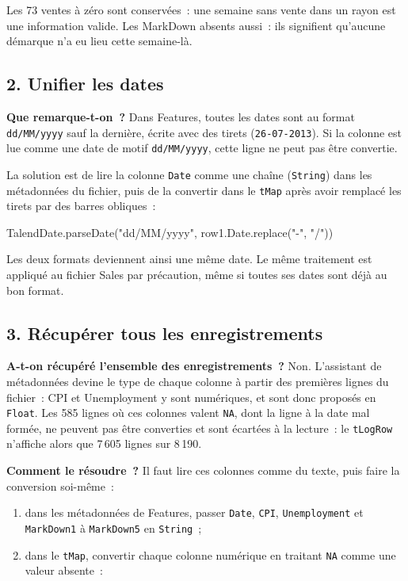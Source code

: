 \noindent Les 73 ventes à zéro sont conservées~: une semaine sans vente dans un rayon est une information valide. Les MarkDown absents aussi~: ils signifient qu'aucune démarque n'a eu lieu cette semaine-là.

\subsection*{2. Unifier les dates}
{}

\noindent \textbf{Que remarque-t-on~?} Dans Features, toutes les dates sont au format \texttt{dd/MM/yyyy} sauf la dernière, écrite avec des tirets (\texttt{26-07-2013}). Si la colonne est lue comme une date de motif \texttt{dd/MM/yyyy}, cette ligne ne peut pas être convertie.

\noindent La solution est de lire la colonne \texttt{Date} comme une chaîne (\texttt{String}) dans les métadonnées du fichier, puis de la convertir dans le \texttt{tMap} après avoir remplacé les tirets par des barres obliques~:

\begin{code}[title=\textbf{Expression de la colonne Date} (sortie de type Date)]
TalendDate.parseDate("dd/MM/yyyy", row1.Date.replace("-", "/"))
\end{code}

\noindent Les deux formats deviennent ainsi une même date. Le même traitement est appliqué au fichier Sales par précaution, même si toutes ses dates sont déjà au bon format.

\subsection*{3. Récupérer tous les enregistrements}
{}

\noindent \textbf{A-t-on récupéré l'ensemble des enregistrements~?} Non. L'assistant de métadonnées devine le type de chaque colonne à partir des premières lignes du fichier~: CPI et Unemployment y sont numériques, et sont donc proposés en \texttt{Float}. Les 585 lignes où ces colonnes valent \texttt{NA}, dont la ligne à la date mal formée, ne peuvent pas être converties et sont écartées à la lecture~: le \texttt{tLogRow} n'affiche alors que 7\,605 lignes sur 8\,190.

\noindent \textbf{Comment le résoudre~?} Il faut lire ces colonnes comme du texte, puis faire la conversion soi-même~:
\begin{enumerate}
	\item dans les métadonnées de Features, passer \texttt{Date}, \texttt{CPI}, \texttt{Unemployment} et \texttt{MarkDown1} à \texttt{MarkDown5} en \texttt{String}~;
	\item dans le \texttt{tMap}, convertir chaque colonne numérique en traitant \texttt{NA} comme une valeur absente~:
\end{enumerate}

